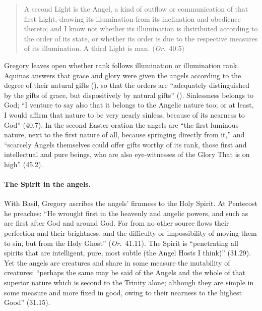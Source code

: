 \begin{quote}
A second Light is the Angel, a kind of outflow or communication of that
first Light, drawing its illumination from its inclination and obedience
thereto; and I know not whether its illumination is distributed according
to the order of its state, or whether its order is due to the respective
measures of its illumination. A third Light is man. (\emph{Or.}\ 40.5)
\end{quote}

\noindent Gregory leaves open whether rank follows illumination or
illumination rank. Aquinas answers that grace and glory were given the
angels according to the degree of their natural gifts (), so that the orders are ``adequately distinguished by the gifts of
grace, but dispositively by natural gifts'' ().
Sinlessness belongs to God; ``I venture to say also that it belongs to
the Angelic nature too; or at least, I would affirm that nature to be very
nearly sinless, because of its nearness to God'' (40.7). In the second
Easter oration the angels are ``the first luminous nature, next to the
first nature of all, because springing directly from it,'' and ``scarcely
Angels themselves could offer gifts worthy of its rank, those first and
intellectual and pure beings, who are also eye-witnesses of the Glory
That is on high'' (45.2).

\paragraph{The Spirit in the angels.} With Basil, Gregory ascribes the
angels' firmness to the Holy Spirit. At Pentecost he preaches: ``He
wrought first in the heavenly and angelic powers, and such as are first
after God and around God. For from no other source flows their perfection
and their brightness, and the difficulty or impossibility of moving them
to sin, but from the Holy Ghost'' (\emph{Or.}\ 41.11). The Spirit is
``penetrating all spirits that are intelligent, pure, most subtle (the
Angel Hosts I think)'' (31.29). Yet the angels are creatures and share in
some measure the mutability of creatures: ``perhaps the same may be said
of the Angels and the whole of that superior nature which is second to
the Trinity alone; although they are simple in some measure and more fixed
in good, owing to their nearness to the highest Good'' (31.15).

